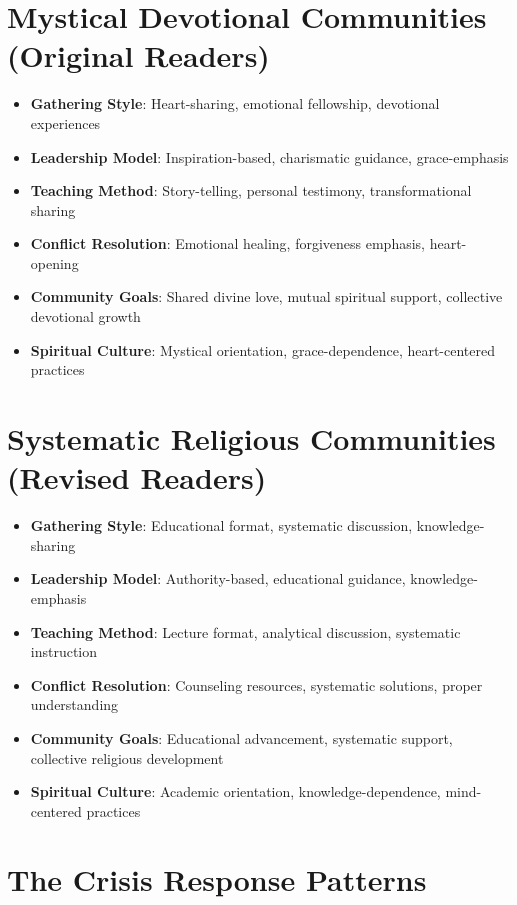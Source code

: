 \documentclass[11pt,twoside]{book}
\begin{document}
\section*{Mystical Devotional Communities (Original Readers)}
\label{sec:orgacaba3e}
\begin{itemize}
\item \textbf{\textbf{Gathering Style}}: Heart-sharing, emotional fellowship, devotional experiences
\item \textbf{\textbf{Leadership Model}}: Inspiration-based, charismatic guidance, grace-emphasis
\item \textbf{\textbf{Teaching Method}}: Story-telling, personal testimony, transformational sharing
\item \textbf{\textbf{Conflict Resolution}}: Emotional healing, forgiveness emphasis, heart-opening
\item \textbf{\textbf{Community Goals}}: Shared divine love, mutual spiritual support, collective devotional growth
\item \textbf{\textbf{Spiritual Culture}}: Mystical orientation, grace-dependence, heart-centered practices
\end{itemize}
\section*{Systematic Religious Communities (Revised Readers)}
\label{sec:org86f5374}
\begin{itemize}
\item \textbf{\textbf{Gathering Style}}: Educational format, systematic discussion, knowledge-sharing
\item \textbf{\textbf{Leadership Model}}: Authority-based, educational guidance, knowledge-emphasis
\item \textbf{\textbf{Teaching Method}}: Lecture format, analytical discussion, systematic instruction
\item \textbf{\textbf{Conflict Resolution}}: Counseling resources, systematic solutions, proper understanding
\item \textbf{\textbf{Community Goals}}: Educational advancement, systematic support, collective religious development
\item \textbf{\textbf{Spiritual Culture}}: Academic orientation, knowledge-dependence, mind-centered practices
\end{itemize}
\section*{The Crisis Response Patterns}
\label{sec:orgf7a745a}
\end{document}
